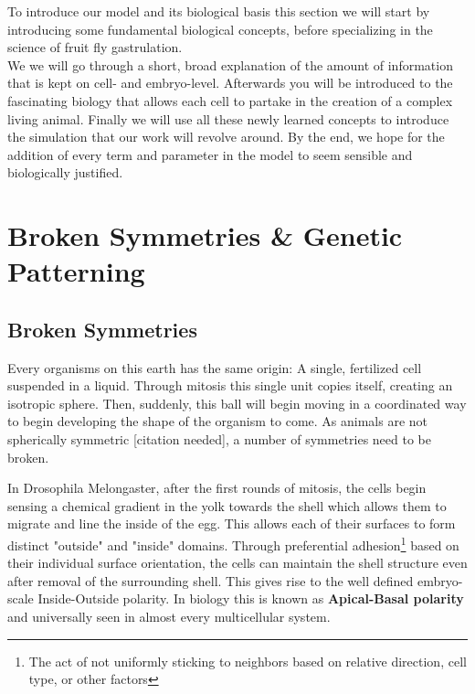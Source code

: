 To introduce our model and its biological basis this section we will start by introducing some fundamental biological concepts, before specializing in the science of fruit fly gastrulation. \\
We we will go through a short, broad explanation of the amount of information that is kept on cell- and embryo-level. Afterwards you will be introduced to the fascinating biology that allows each cell to partake in the creation of a complex living animal. Finally we will use all these newly learned concepts to introduce the simulation that our work will revolve around. By the end, we hope for the addition of every term and parameter in the model to seem sensible and biologically justified. 


\section{\hspace{-0.2cm}Broken Symmetries \& Genetic Patterning}
\label{sec:theory-polarity}
\subsection{Broken Symmetries}

Every organisms on this earth has the same origin: A single, fertilized cell suspended in a liquid. Through mitosis this single unit copies itself,  creating an isotropic sphere. Then, suddenly, this ball will begin moving in a coordinated way to begin developing the shape of the organism to come. As animals are not spherically symmetric [citation needed], a number of symmetries need to be broken. 

In Drosophila Melongaster, after the first rounds of mitosis, the cells begin sensing a chemical gradient in the yolk towards the shell which allows them to migrate and line the inside of the egg. This allows each of their surfaces to form distinct "outside" and "inside" domains. Through preferential adhesion\footnote{The act of not uniformly sticking to neighbors based on relative direction, cell type, or other factors} based on their individual surface orientation, the cells can maintain the shell structure even after removal of the surrounding shell. This gives rise to the well defined embryo-scale Inside-Outside polarity. In biology this is known as \textbf{Apical-Basal polarity} and universally seen in almost every multicellular system. 

